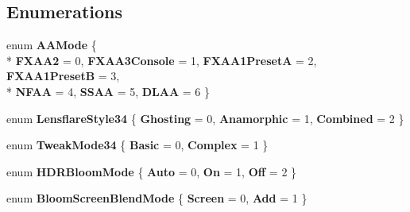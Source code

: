 \subsection*{Enumerations}
\begin{DoxyCompactItemize}
\item 
enum {\bfseries A\+A\+Mode} \{ \\*
{\bfseries F\+X\+A\+A2} = 0, 
{\bfseries F\+X\+A\+A3\+Console} = 1, 
{\bfseries F\+X\+A\+A1\+PresetA} = 2, 
{\bfseries F\+X\+A\+A1\+PresetB} = 3, 
\\*
{\bfseries N\+F\+AA} = 4, 
{\bfseries S\+S\+AA} = 5, 
{\bfseries D\+L\+AA} = 6
 \}\hypertarget{namespace_unity_standard_assets_1_1_image_effects_a158625add19c62e52c685a8700b4cd99}{}\label{namespace_unity_standard_assets_1_1_image_effects_a158625add19c62e52c685a8700b4cd99}

\item 
enum {\bfseries Lensflare\+Style34} \{ {\bfseries Ghosting} = 0, 
{\bfseries Anamorphic} = 1, 
{\bfseries Combined} = 2
 \}\hypertarget{namespace_unity_standard_assets_1_1_image_effects_a867a388bb9f7b5d064b99c6e2d14966f}{}\label{namespace_unity_standard_assets_1_1_image_effects_a867a388bb9f7b5d064b99c6e2d14966f}

\item 
enum {\bfseries Tweak\+Mode34} \{ {\bfseries Basic} = 0, 
{\bfseries Complex} = 1
 \}\hypertarget{namespace_unity_standard_assets_1_1_image_effects_aad04ccb197e6c2c9f40afbbc5f387460}{}\label{namespace_unity_standard_assets_1_1_image_effects_aad04ccb197e6c2c9f40afbbc5f387460}

\item 
enum {\bfseries H\+D\+R\+Bloom\+Mode} \{ {\bfseries Auto} = 0, 
{\bfseries On} = 1, 
{\bfseries Off} = 2
 \}\hypertarget{namespace_unity_standard_assets_1_1_image_effects_a80dad9689d9811c8715cc09830fc8b1d}{}\label{namespace_unity_standard_assets_1_1_image_effects_a80dad9689d9811c8715cc09830fc8b1d}

\item 
enum {\bfseries Bloom\+Screen\+Blend\+Mode} \{ {\bfseries Screen} = 0, 
{\bfseries Add} = 1
 \}\hypertarget{namespace_unity_standard_assets_1_1_image_effects_a02785e2abb5d4a7cd6d77453b2298730}{}\label{namespace_unity_standard_assets_1_1_image_effects_a02785e2abb5d4a7cd6d77453b2298730}

\end{DoxyCompactItemize}
